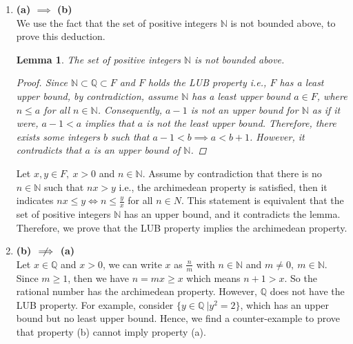 \documentclass[a4pap er]{article}
\newcommand{\N}{\mathbb{N}}
\newcommand{\Q}{\mathbb{Q}}
\theoremstyle{plain}
\newtheorem{lemma}{Lemma}
\begin{document}
\begin{enumerate}
\item \textbf{(a) $\implies$ (b)} \\
We use the fact that the set of positive integers $\N$
is not bounded above, to prove this deduction.
\begin{lemma} The set of positive integers $\N$ is not 
    bounded above.
\begin{proof}
    Since $\N \subset \Q \subset F$ and $F$ holds the LUB
    property i.e., $F$ has a least upper bound, 
    by contradiction, assume $\N$ has a least upper bound
    $a \in F$, where $n \leq a$ for all $n \in \N$.
    Consequently, $a-1$ is not an upper bound for $\N$
    as if it were, $a-1 < a$ implies that $a$ is not the
    \textit{least} upper bound. Therefore, there exists
    some integers $b$ such that $a-1 < b \implies a<b+1$.
    However, it contradicts that $a$ is an upper bound of
    $\N$.
\end{proof}
\end{lemma}
Let $x, y \in F, \ x > 0$ and $n \in \N$. Assume by
contradiction that there is no $n \in \N$ such that 
$nx > y$ i.e., the archimedean property is satisfied, then
it indicates $nx \leq y \iff n \leq \frac{y}{x}$ for all 
$n \in N$. This statement is equivalent that the set of 
positive integers $\N$ has an upper bound, and it 
contradicts the lemma. Therefore, we prove that the LUB
property implies the archimedean property.

\item \textbf{(b) $\centernot\implies$ (a)} \\
    Let $x \in \Q$ and $x > 0$, we can write $x$ as $\frac{n}{m}$ with $n \in \N$ and 
    $m \neq 0, \ m \in \N$. Since $m \geq 1$, then we have $n = mx \geq x$ which
    means $n+1 > x$. So the rational number has the archimedean property.
    However, $\Q$ does not have the LUB property. For example, consider
    $\{y \in \Q \  | y^2 = 2 \}$, which has an upper bound but no least upper bound.
    Hence, we find a counter-example to prove that property (b) cannot imply
    property (a).
\end{enumerate}
\end{document}
